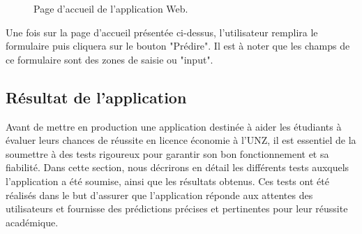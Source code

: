 \begin{figure}[H]%
    \center%
    \setlength{\fboxsep}{5pt}%
    \setlength{\fboxrule}{0.5pt}%
    \caption{Page d’accueil de l’application Web.}%
\end{figure}
Une fois sur la page d'accueil présentée ci-dessus, l'utilisateur remplira le formulaire puis cliquera sur le bouton "Prédire". Il est à noter que les champs de ce formulaire sont des zones de saisie ou "input".

\subsection{Résultat de l'application}
Avant de mettre en production une application destinée à aider les étudiants à évaluer leurs chances de réussite en licence économie à l'UNZ, il est essentiel de la soumettre à des tests rigoureux pour garantir son bon fonctionnement et sa fiabilité. Dans cette section, nous décrirons en détail les différents tests auxquels l'application a été soumise, ainsi que les résultats obtenus. Ces tests ont été réalisés dans le but d'assurer que l'application réponde aux attentes des utilisateurs et fournisse des prédictions précises et pertinentes pour leur réussite académique.

